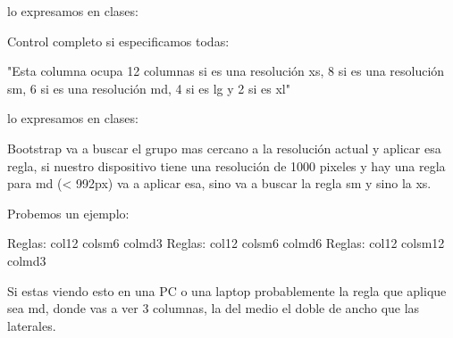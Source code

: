 \documentclass[letterpaper,10pt,spanish]{sphinxmanual}
\begin{document}
lo expresamos en clases: 

Control completo si especificamos todas:

"Esta columna ocupa 12 columnas si es una resolución xs, 8 si es una resolución sm, 6 si es una resolución md, 4 si es lg y 2 si es xl"

lo expresamos en clases: 

Bootstrap va a buscar el grupo mas cercano a la resolución actual y aplicar esa
regla, si nuestro dispositivo tiene una resolución de 1000 pixeles y hay una
regla para md (\textless{} 992px) va a aplicar esa, sino va a buscar la regla sm y sino
la xs.

Probemos un ejemplo:

%
\begin{sphinxVerbatim}[commandchars=\\\{\}]
 
  
   
       Reglas: col\PYGZhy{}12 col\PYGZhy{}sm\PYGZhy{}6 col\PYGZhy{}md\PYGZhy{}3
   
       Reglas: col\PYGZhy{}12 col\PYGZhy{}sm\PYGZhy{}6 col\PYGZhy{}md\PYGZhy{}6
   
        Reglas: col\PYGZhy{}12 col\PYGZhy{}sm\PYGZhy{}12 col\PYGZhy{}md\PYGZhy{}3
\end{sphinxVerbatim}



Si estas viendo esto en una PC o una laptop probablemente la regla que aplique
sea md, donde vas a ver 3 columnas, la del medio el doble de ancho que las
laterales.
\end{document}
